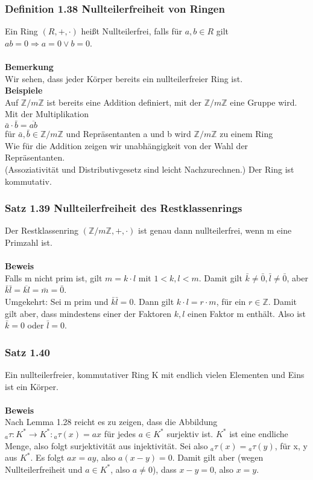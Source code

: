 \documentclass{scrartcl}
\newcommand{\Z}{\mathbb{Z}}
\newcommand{\tableoftheorems}{\section*{S\"atze und Lemmata}}
\begin{document}
\subsubsection{Definition 1.38 Nullteilerfreiheit von Ringen}
Ein Ring \((R, +, \cdot)\) hei\ss{}t Nullteilerfrei, falls f\"ur \(a, b \in R\) gilt \(ab = 0 \Rightarrow a = 0 \lor b = 0\).\\
\\
\textbf{Bemerkung}\\
Wir sehen, dass jeder K\"orper bereits ein nullteilerfreier Ring ist.\\
\textbf{Beispiele}\\
Auf \(\Z/m\Z\) ist bereits eine Addition definiert, mit der \(\Z/m\Z\) eine Gruppe wird. Mit der Multiplikation\\
\(\bar{a} \cdot \bar{b} = \overline{ab}\)\\
f\"ur \(\bar{a}, \bar{b} \in \Z / m\Z\) und Repr\"asentanten a und b wird \(\Z/m\Z\) zu einem Ring\\
Wie f\"ur die Addition zeigen wir unabh\"angigkeit von der Wahl der Repr\"asentanten.\\
(Assoziativit\"at und Distributivgesetz sind leicht Nachzurechnen.) Der Ring ist kommutativ.

\subsubsection{Satz 1.39 Nullteilerfreiheit des Restklassenrings}
Der Restklassenring \((\Z/m\Z, +, \cdot)\) ist genau dann nullteilerfrei, wenn m eine Primzahl ist.\\
\\
\textbf{Beweis}\\
Falls m nicht prim ist, gilt \(m = k \cdot l\) mit \(1 < k, l < m\). Damit gilt \(\bar{k} \neq \bar{0}, \bar{l} \neq \bar{0}\), aber \(\bar{k} \bar{l}= \overline{kl} = \bar{m} = \bar{0}\).\\Umgekehrt: Sei m prim und \(\bar{k} \bar{l} = 0\). Dann gilt \(k \cdot l= r \cdot m\), f\"ur ein \(r \in \Z\). Damit gilt aber, dass mindestens einer der Faktoren \(k, l\) einen Faktor m enth\"alt. Also ist \(\bar{k} = 0\) oder \(\bar{l} = 0\).

\subsubsection{Satz 1.40}
Ein nullteilerfreier, kommutativer Ring K mit endlich vielen Elementen und Eins ist ein K\"orper.\\
\\
\textbf{Beweis}\\
Nach Lemma 1.28 reicht es zu zeigen, dass die Abbildung \({}_{a}\tau : K^* \to K^* : {}_{a}\tau(x) = ax\) f\"ur jedes \(a \in K^*\) surjektiv ist. \(K^*\) ist eine endliche Menge, also folgt surjektivit\"at aus injektivit\"at. Sei also \({}_a\tau(x) = {}_a\tau(y)\), f\"ur x, y aus \(K^*\). Es folgt \(ax = ay\), also \(a (x - y) = 0\). Damit gilt aber  (wegen Nullteilerfreiheit und \(a \in K^*\), also \(a \neq 0\)), dass \(x - y = 0\), also \(x = y\).
\end{document}
